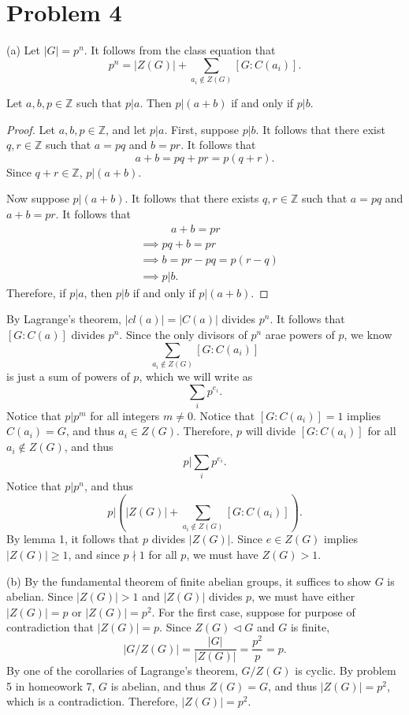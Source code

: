 \documentclass[11pt, letterpaper]{report}
\begin{document}
\section*{Problem 4}
(a) Let $\left| G \right| =p^n$. It follows from the class equation that
\[
	p^n = \left| Z(G) \right| +\sum_{a_i\notin Z\left( G \right) }\left[ G : C(a_i) \right]  
.\]
\begin{lemma}
	Let $a,b,p\in\mathbb{Z}$ such that $p|a$. Then $p|(a+b)$ if and only if $p|b$.
\end{lemma}
\begin{proof}
	Let $a,b,p\in\mathbb{Z}$, and let $p|a$. First, suppose $p|b$. It follows that there exist $q,r\in\mathbb{Z}$ such that $a=pq$ and $b=pr$. It follows that
	\[
		a+b=pq+pr=p(q+r)
	.\]
	Since $q+r\in\mathbb{Z}$, $p|(a+b)$.

	Now suppose $p|(a+b)$. It follows that there exists $q,r\in\mathbb{Z}$ such that $a=pq$ and $a+b=pr$. It follows that
	\begin{align*}
		&\qquad\;\;\;a+b=pr\\
		&\implies pq+b=pr\\
		&\implies b=pr-pq=p(r-q)\\
		&\implies p|b
	.\end{align*}
	Therefore, if $p|a$, then $p|b$ if and only if $p|(a+b)$.
\end{proof}
By Lagrange's theorem, $\left| cl(a) \right| =\left| C(a) \right| $ divides $p^n$. It follows that $\left[ G : C(a) \right] $ divides $p^n$. Since the only divisors of $p^n$ arae powers of $p$, we know
\[
	\sum_{a_i\notin Z(G)} \left[ G: C(a_i) \right]  
\]
is just a sum of powers of $p$, which we will write as
\[
	\sum_i p ^{e_i}
.\]
Notice that $p|p^m$ for all integers $m\neq 0$. Notice that $\left[ G : C(a_i) \right] =1$ implies $C(a_i)=G$, and thus $a_i\in Z(G)$. Therefore, $p$ will divide $\left[ G : C(a_i) \right] $ for all $a_i\notin Z(G)$, and thus
\[
p|\sum_{i} p ^{e_i}
.\]
Notice that $p|p^n$, and thus
\[
	p|\left( \left| Z(G) \right| +\sum_{a_i\notin Z(G)}\left[ G : C(a_i) \right]   \right) 
.\]
By lemma 1, it follows that $p$ divides $\left| Z(G) \right| $. Since $e\in Z(G)$ implies $\left| Z(G) \right| \geq 1$, and since $p\nmid 1$ for all $p$, we must have $Z(G)>1$.

(b) By the fundamental theorem of finite abelian groups, it suffices to show $G$ is abelian. Since $\left| Z(G) \right| >1$ and $\left| Z(G) \right| $ divides $p$, we must have either $\left| Z(G) \right| =p$ or $\left| Z(G) \right| =p^2$. For the first case, suppose for purpose of contradiction that $\left| Z(G) \right| =p$. Since $Z(G)\triangleleft G$ and $G$ is finite,
\[
	\left| G / Z(G) \right| =\frac{\left| G \right| }{\left| Z(G) \right| }=\frac{p^2}{p}=p
.\]
By one of the corollaries of Lagrange's theorem, $G /Z(G)$ is cyclic. By problem 5 in homeowork 7, $G$ is abelian, and thus $Z(G)=G$, and thus $\left| Z(G) \right| =p^2$, which is a contradiction. Therefore, $\left| Z(G) \right| =p^2$.
\end{document}
